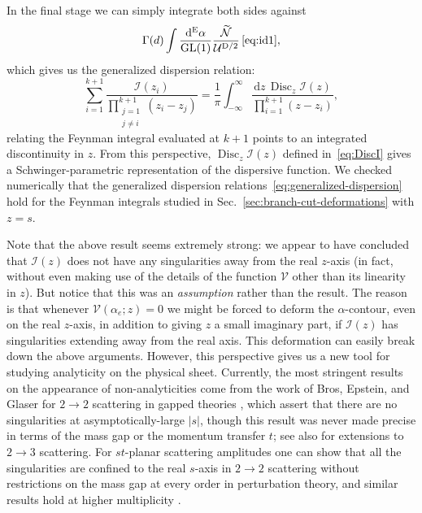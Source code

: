 \documentclass[12pt]{article}
\numberwithin{figure}{section}
\DeclareMathOperator{\Disc}{Disc}
\def \be {\begin{equation}}
\def \ee {\end{equation}}
\def \D {\mathrm{D}}
\def \E {\mathrm{E}}
\def \U {\mathcal{U}}
\def \d {\mathrm{d}}
\def \V {\mathcal{V}}
\def \I {\mathcal{I}}
\def \GL {\mathrm{GL}}
\def \N {\mathcal{N}}
\begin{document}
    In the final stage we can simply integrate both sides against
    \be
    \Gamma(d) \int \frac{\d^\E \alpha}{\GL(1)} \frac{\widetilde{\N}}{\U^{\D/2}}\, \eqref{eq:id1},
    \ee
    which gives us the generalized dispersion relation:
    \be\label{eq:generalized-dispersion}
    \boxed{
    \sum_{i=1}^{k+1} \frac{\I(z_i)}{\prod_{\substack{j=1\\ j\neq i}}^{k+1} (z_i - z_j)} = \frac{1}{\pi} \int_{-\infty}^{\infty} \frac{\d z\, \Disc_z \I(z)}{\prod_{i=1}^{k+1}(z - z_i)},}
    \ee
    relating the Feynman integral evaluated at $k{+}1$ points to an integrated discontinuity in $z$. From this perspective, $\Disc_z \I(z)$ defined in~\eqref{eq:DiscI} gives a Schwinger-parametric representation of the dispersive function.
    We checked numerically that the generalized dispersion relations~\eqref{eq:generalized-dispersion} hold for the Feynman integrals studied in Sec.~\ref{sec:branch-cut-deformations} with $z=s$.
    
    Note that the above result seems extremely strong: we appear to have concluded that $\I(z)$ does not have any singularities away from the real $z$-axis (in fact, without even making use of the details of the function $\V$ other than its linearity in $z$). But notice that this was an \emph{assumption} rather than the result. The reason is that whenever $\V(\alpha_e; z) = 0$ we might be forced to deform the $\alpha$-contour, even on the real $z$-axis, in addition to giving $z$ a small imaginary part, if $\I(z)$ has singularities extending away from the real axis. This deformation can easily break down the above arguments. However, this perspective gives us a new tool for studying analyticity on the physical sheet. Currently, the most stringent results on the appearance of non-analyticities come from the work of Bros, Epstein, and Glaser for $2\to 2$ scattering in gapped theories \cite{Bros:1964iho,Bros:1965kbd}, which assert that there are no singularities at asymptotically-large $|s|$, though this result was never made precise in terms of the mass gap or the momentum transfer $t$; see also \cite{Bros:1972jh,Bros:1985gy} for extensions to $2\to 3$ scattering. For $st$-planar scattering amplitudes one can show that all the singularities are confined to the real $s$-axis in $2\to 2$ scattering without restrictions on the mass gap at every order in perturbation theory, and similar results hold at higher multiplicity \cite{Mizera:2021fap}.

    
\end{document}
